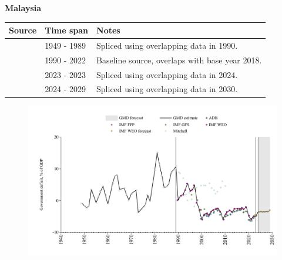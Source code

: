 \documentclass[12pt,a4paper,landscape]{article}
\begin{document}
\begin{adjustbox}{max totalsize={\paperwidth}{\paperheight},center}
\begin{minipage}[t][\textheight][t]{\textwidth}
\vspace*{0.5cm}
{}
\begin{center}
{\Large\bfseries Malaysia}
\end{center}
\vspace{0.5cm}
\begin{table}[H]
\centering
\small
\begin{tabular}{|l|l|l|}
\hline
\textbf{Source} & \textbf{Time span} & \textbf{Notes} \\
\hline
\rowcolor{white}\cite{Mitchell}& 1949 - 1989 &Spliced using overlapping data in 1990.\\
\rowcolor{lightgray}\cite{IMF_WEO}& 1990 - 2022 &Baseline source, overlaps with base year 2018.\\
\rowcolor{white}\cite{IMF_GFS}& 2023 - 2023 &Spliced using overlapping data in 2024.\\
\rowcolor{lightgray}\cite{IMF_WEO_forecast}& 2024 - 2029 &Spliced using overlapping data in 2030.\\
\hline
\end{tabular}
\end{table}
\begin{figure}[H]
\centering
\includegraphics[width=\textwidth,height=0.6\textheight,keepaspectratio]{graphs/MYS_govdef_GDP.pdf}
\end{figure}
\end{minipage}
\end{adjustbox}
\end{document}
